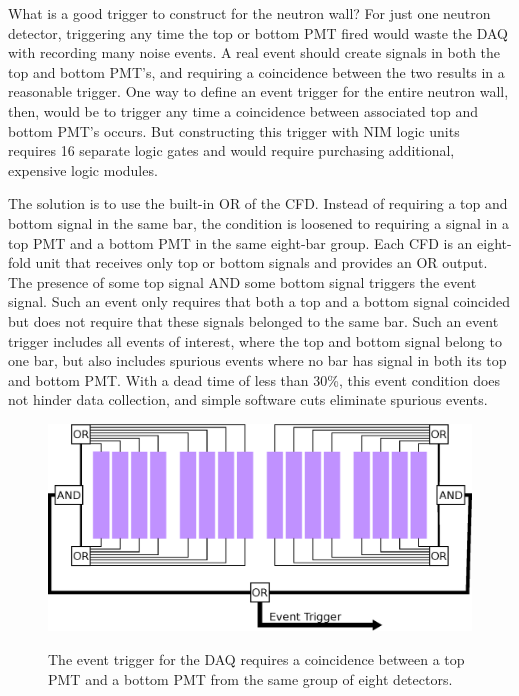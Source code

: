 What is a good trigger to construct for the neutron wall?  For just one neutron detector, triggering any time the top or bottom PMT fired would waste the DAQ with recording many noise events.  A real event should create signals in both the top and bottom PMT's, and requiring a coincidence between the two results in a reasonable trigger.  One way to define an event trigger for the entire neutron wall, then, would be to trigger any time a coincidence between associated top and bottom PMT's occurs.  But constructing this trigger with NIM logic units requires 16 separate logic gates and would require purchasing additional, expensive logic modules.  

The solution is to use the built-in OR of the CFD.  Instead of requiring a top and bottom signal in the same bar, the condition is loosened to requiring a signal in a top PMT and a bottom PMT in the same eight-bar group.  Each CFD is an eight-fold unit that receives only top or bottom signals and provides an OR output.  The presence of some top signal AND some bottom signal triggers the event signal.  Such an event only requires that both a top and a bottom signal coincided but does not require that these signals belonged to the same bar.  Such an event trigger includes all events of interest, where the top and bottom signal belong to one bar, but also includes spurious events where no bar has signal in both its top and bottom PMT.  With a dead time of less than 30\%, this event condition does not hinder data collection, and simple software cuts eliminate spurious events.

\begin{figure}[htp]
\centering
\includegraphics[width=1.0\textwidth]{figures/event_trigger.eps}
\label{fig:eventTrig}
\caption{The event trigger for the DAQ requires a coincidence between a top PMT and a bottom PMT from the same group of eight detectors.}
\end{figure}


